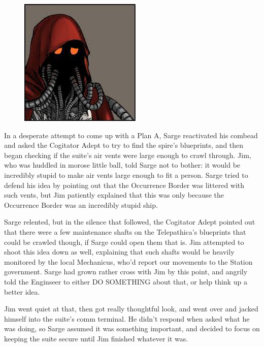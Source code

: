\begin{figure}
	\begin{center}
		\includegraphics[width=\figwidth]{pics/14/27.png}
	\end{center}
\end{figure}
In a desperate attempt to come up with a Plan A, Sarge reactivated his combead and asked the Cogitator Adept to try to find the spire's blueprints, and then began checking if the suite's air vents were large enough to crawl through. 
Jim, who was huddled in morose little ball, told Sarge not to bother: 
it would be incredibly stupid to make air vents large enough to fit a person. 
Sarge tried to defend his idea by pointing out that the Occurrence Border was littered with such vents, but Jim patiently explained that this was only because the Occurrence Border was an incredibly stupid ship. 


Sarge relented, but in the silence that followed, the Cogitator Adept pointed out that there were a few maintenance shafts on the Telepathica's blueprints that could be crawled though, if Sarge could open them that is. 
Jim attempted to shoot this idea down as well, explaining that such shafts would be heavily monitored by the local Mechanicus, who'd report our movements to the Station government. 
Sarge had grown rather cross with Jim by this point, and angrily told the Enginseer to either DO SOMETHING about that, or help think up a better idea.

Jim went quiet at that, then got really thoughtful look, and went over and jacked himself into the suite's comm terminal. 
He didn't respond when asked what he was doing, so Sarge assumed it was something important, and decided to focus on keeping the suite secure until Jim finished whatever it was.

